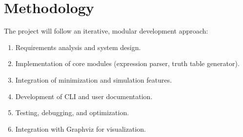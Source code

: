 \section{Methodology}
The project will follow an iterative, modular development approach:

\begin{enumerate}
    \item Requirements analysis and system design.
    \item Implementation of core modules (expression parser, truth table generator).
    \item Integration of minimization and simulation features.
    \item Development of CLI and user documentation.
    \item Testing, debugging, and optimization.
    \item Integration with Graphviz for visualization.
\end{enumerate}